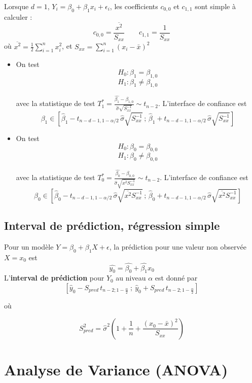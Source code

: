 \documentclass[12pt,a4paper]{article}
\begin{document}
Lorsque $d=1$, $Y_i = \beta_0 + \beta_1 x_i + \epsilon_i$, les coefficients $c_{0,0}$ et $c_{1,1}$ sont simple à calculer :
$$c_{0,0} = \frac{\overline{x^2}}{S_{xx}} \qquad c_{1,1} = \frac{1}{S_{xx}}$$
où $\overline{x^2} = \frac{1}{2} \sum_{i=1}^n x_i^2$, et $S_{xx} = \sum_{i=1}^n (x_i - \bar{x})^2$
\begin{itemize}
    \item On test
    $$H_0 : \beta_1 = \beta_{1,0}$$
    $$H_1 : \beta_1 \neq \beta_{1,0}$$

    avec la statistique de test $T_1^* = \frac{\hat{\beta_1} - \beta_{1,0}}{\hat{\sigma} \sqrt{S_{xx}^{-1}}} \sim t_{n-2}$. L'interface de confiance est
    $$\beta_1 \in \left[ \widehat{\beta}_1 - t_{n-d-1, 1-\alpha/2} \, \widehat{\sigma} \sqrt{S_{xx}^{-1}} \, ; \, \widehat{\beta}_1 + t_{n-d-1, 1-\alpha/2} \, \widehat{\sigma} \sqrt{S_{xx}^{-1}} \right]$$

    \item On test
    $$H_0 : \beta_0 = \beta_{0,0}$$
    $$H_1 : \beta_0 \neq \beta_{0,0}$$

    avec la statistique de test $T_0^* = \frac{\hat{\beta_0} - \beta_{0,0}}{\hat{\sigma} \sqrt{\overline{x^2}S_{xx}^{-1}}} \sim t_{n-2}$. L'interface de confiance est
    $$\beta_0 \in \left[ \widehat{\beta}_0 - t_{n-d-1, 1-\alpha/2} \, \widehat{\sigma} \sqrt{\overline{x^2}S_{xx}^{-1}} \, ; \, \widehat{\beta}_0 + t_{n-d-1, 1-\alpha/2} \, \widehat{\sigma} \sqrt{\overline{x^2}S_{xx}^{-1}} \right]$$
\end{itemize}


\subsection{Interval de prédiction, régression simple}

Pour un modèle $Y = \beta_0 + \beta_1 X + \epsilon$, la prédiction pour une valeur non observée $X = x_0$ est
$$\hat{y_0} = \hat{\beta_0} + \hat{\beta_1} x_0$$
L'\textbf{interval de prédiction} pour $Y_0$ au niveau $\alpha$ est donné par
$$\left[ \hat{y}_0 - S_{pred} \, t_{n-2; 1-\frac{\alpha}{2}} \ ; \ \hat{y}_0 + S_{pred} \, t_{n-2; 1-\frac{\alpha}{2}} \right]$$

où

$$S_{pred}^2 = \hat{\sigma}^2 \left( 1 + \frac{1}{n} + \frac{(x_0 - \bar{x})^2}{S_{xx}} \right)$$




\section{Analyse de Variance (ANOVA)}
\end{document}
